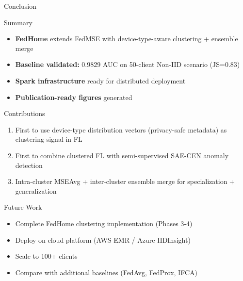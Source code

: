 \documentclass[10pt, aspectratio=169]{beamer}
\begin{document}
\begin{frame}{Conclusion}
    \begin{block}{Summary}
        \begin{itemize}
            \item \textbf{FedHome} extends FedMSE with device-type-aware clustering + ensemble merge
            \item \textbf{Baseline validated:} 0.9829 AUC on 50-client Non-IID scenario (JS=0.83)
            \item \textbf{Spark infrastructure} ready for distributed deployment
            \item \textbf{Publication-ready figures} generated
        \end{itemize}
    \end{block}
    
    \vspace{0.5cm}
    
    \begin{block}{Contributions}
        \begin{enumerate}
            \item First to use device-type distribution vectors (privacy-safe metadata) as clustering signal in FL
            \item First to combine clustered FL with semi-supervised SAE-CEN anomaly detection
            \item Intra-cluster MSEAvg + inter-cluster ensemble merge for specialization + generalization
        \end{enumerate}
    \end{block}
    
    \vspace{0.5cm}
    
    \begin{block}{Future Work}
        \begin{itemize}
            \item Complete FedHome clustering implementation (Phases 3-4)
            \item Deploy on cloud platform (AWS EMR / Azure HDInsight)
            \item Scale to 100+ clients
            \item Compare with additional baselines (FedAvg, FedProx, IFCA)
        \end{itemize}
    \end{block}
\end{frame}
\end{document}
